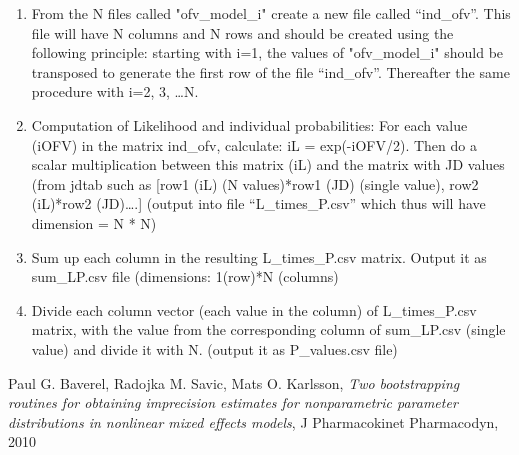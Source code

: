 \begin{enumerate}
\begin{enumerate}
	\end{enumerate}
\item From the N files called "ofv\_model\_i" create a new file called “ind\_ofv”. This file will have N columns and N rows and should be created using the following principle: starting with i=1, the values of "ofv\_model\_i" should be transposed to generate the first row of the file “ind\_ofv”. Thereafter the same procedure with i=2, 3, …N. 
\item Computation of Likelihood and individual probabilities: For each value (iOFV) in the matrix ind\_ofv, calculate:  iL = exp(-iOFV/2). Then do a scalar multiplication between this matrix (iL) and the matrix with JD values (from jdtab such as 
	[row1 (iL) (N values)*row1 (JD) (single value), row2 (iL)*row2 (JD)….] 
	(output into file “L\_times\_P.csv” which thus will have dimension = N * N)
\item Sum up each column in the resulting L\_times\_P.csv matrix. Output it as sum\_LP.csv file (dimensions: 1(row)*N (columns)
\item Divide each column vector (each value in the column)  of L\_times\_P.csv matrix, with the value from the corresponding column of sum\_LP.csv (single value) and divide it with N. (output it as P\_values.csv file)
\end{enumerate}

\begin{thebibliography}{1}
 Paul G. Baverel, Radojka M. Savic, Mats O. Karlsson, {\em Two bootstrapping routines for obtaining imprecision estimates for nonparametric parameter distributions in nonlinear mixed effects models}, J Pharmacokinet Pharmacodyn, 2010
\end{thebibliography}


